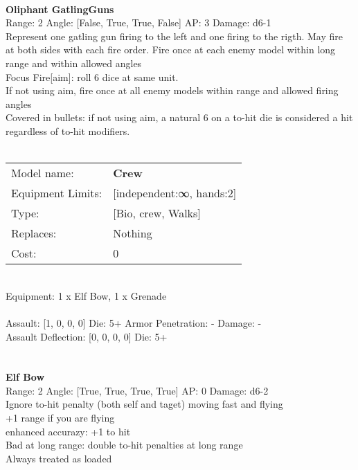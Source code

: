 \ \\
{\bf Oliphant GatlingGuns } \\



Range: 2  Angle: [False, True, True, False] AP: 3 Damage: d6-1 \\
Represent one gatling gun firing to the left and one firing to the rigth. May fire at both sides with each fire order. Fire once at each enemy model within long range and within allowed angles\\ 
Focus Fire[aim]: roll 6 dice at same unit.\\ 
If not using aim, fire once at all enemy models within range and allowed firing angles\\ 
Covered in bullets: if not using aim, a natural 6 on a to-hit die is considered a hit regardless of to-hit modifiers.\\ 




 
\ \\

\noindent
\begin{tabular}{ll}
Model name: &{\bf Crew } \\
Equipment Limits: &[independent:∞, hands:2] \\
Type: &[Bio, crew, Walks] \\
Replaces: &Nothing \\
Cost: & 0\\
\end{tabular}
\ \\
Equipment: 1 x Elf Bow, 1 x Grenade \\
\ \\
Assault: [1, 0, 0, 0] Die: 5+ Armor Penetration: - Damage: - \\
Assault Deflection: [0, 0, 0, 0] Die: 5+\\
\indent  
\ \\

\ \\
{\bf Elf Bow } \\



Range: 2  Angle: [True, True, True, True] AP: 0 Damage: d6-2 \\
Ignore to-hit penalty (both self and taget) moving fast and flying\\ 
+1 range if you are flying\\ 
enhanced accurazy: +1 to hit\\ 
Bad at long range: double to-hit penalties at long range\\ 
Always treated as loaded\\ 




